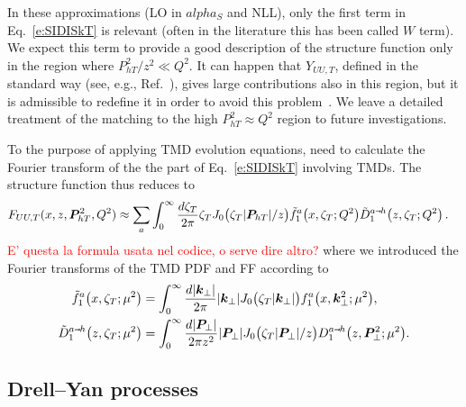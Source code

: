 \documentclass[aps,preprintnumbers,showpacs,nofootinbib,superscriptaddress,floatfix]{revtex4}
\newcommand{\smarrow}{\mbox{\raisebox{-4.5pt}[0pt][0pt]{$\hspace{-1pt} 
		\vec{\phantom{v}}$}}}
\newcommand{\T}{\perp}
\newcommand{\Tperp}{T}
\newcommand{\bT}{\zeta_T}
\begin{document}
In these approximations (LO in $alpha_S$ and NLL), only the first term in
Eq.~\eqref{e:SIDISkT} is relevant (often in the
literature this has been called $W$ term). We expect this term to provide a
good description of the
structure function only in the region where $P_{hT}^2/z^2 \ll Q^2$. 
It can happen that $Y_{UU,T}$, defined
in the standard way (see, e.g., Ref.~\cite{Collins:1984kg}), gives large
contributions also in this region, but it is admissible to
redefine it in order to avoid this problem~\cite{Collins:2016hqq}. 
We leave a detailed treatment of the matching to the high $P_{hT}^2 \approx Q^2$
region to future investigations.   

To the purpose of applying TMD evolution equations, 
 need to calculate the Fourier transform of the the part of 
Eq.~\eqref{e:SIDISkT} involving TMDs. The structure function thus reduces to 
\begin{align}
\label{e:SIDISkTFF}
   F_{UU,T}(x,z, \bm{P}_{h \Tperp}^2, Q^2) &\approx \sum_a  
      \int_0^{\infty} \frac{d \bT}{2 \pi} \bT J_0\big(\bT |\bm{P}_{hT}|/z\big)
      \tilde{f}_1^a\big(x, \bT;Q^2\big) \tilde{D}_1^{a\smarrow h}\big(z, \bT;
      Q^2 \big) 
\nonumber \, .
\end{align} 
\textcolor{red}{ E' questa la formula usata nel codice, o serve dire altro?}
where we introduced the Fourier transforms of the TMD PDF and FF according to
\begin{align} 
\tilde{f}_1^a\big(x, \bT;\mu^2\big) &=
\int_0^{\infty}\frac{d |\bm{k}_\T|}{2 \pi} 
                |\bm{k}_\T|J_0\big(\bT |\bm{k}_\T|\big) 
       f_1^a\big(x, \bm{k}_\T^2;\mu^2\big),
\\
\tilde{D}_1^{a\smarrow h}\big(z, \bT; \mu^2 \big) &=
 \int_0^{\infty} \frac{d |\bm{P}_{\T}|}{2 \pi z^2} |\bm{P}_{\T}| 
                                             J_0\big(\bT |\bm{P}_{\T}|/z\big)
       D_1^{a\smarrow h}\big(z, \bm{P}_{\T}^2; \mu^2 \big).
\end{align}  


\subsection{Drell--Yan processes}
\label{ss:DY_formalism}
\end{document}
